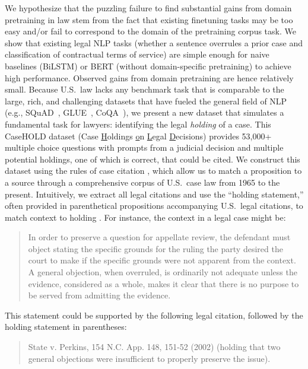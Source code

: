 \documentclass[sigconf]{acmart}
\begin{document}
We hypothesize that the puzzling failure to find substantial gains from domain pretraining in law stem from the fact that existing finetuning tasks may be too easy and/or fail to correspond to the domain of the pretraining corpus task. We show that  existing legal NLP tasks (whether a sentence overrules a prior case and classification of contractual terms of service) are simple enough for naive baselines (BiLSTM) or BERT (without domain-specific pretraining) to achieve high performance.  Observed gains from domain pretraining are hence relatively small. Because U.S.\ law lacks any benchmark task that is comparable to the large, rich, and challenging datasets that have fueled the general field of NLP (e.g., SQuAD~\cite{Rajpurkar2016}, GLUE~\cite{Wang2018}, CoQA~\cite{reddy2019coqa}), we present a new dataset that simulates a fundamental task for lawyers: identifying the legal \emph{holding} of a case.  This CaseHOLD dataset (Case \underline{H}oldings \underline{o}n \underline{L}egal \underline{D}ecisions) provides 53,000+ multiple choice questions with prompts from a judicial decision and multiple potential holdings, one of which is correct, that could be cited.  We construct this dataset using the rules of case citation \cite{bluebook}, which allow us to match a proposition to a source through a comprehensive corpus of U.S.\ case law from 1965 to the present. Intuitively, we extract all legal citations and use the ``holding statement,'' often provided in parenthetical propositions accompanying U.S.\ legal citations, to match context to holding \cite{arredondo2017harvesting}.  For instance, the context in a legal case might be: 
\begin{quote}
In order to preserve a question for appellate review, the defendant must object stating the specific grounds for the ruling the party desired the court to make if the specific grounds were not apparent from the context. 
A general objection, when overruled, is ordinarily not adequate unless the evidence, considered as a whole, makes it clear that there is no purpose to be served from admitting the evidence.
\end{quote} 
This statement could be supported by the following legal citation, followed by the holding statement in parentheses:
\begin{quote}
State v. Perkins, 154 N.C. App. 148, 151-52 (2002) (holding that two general objections were insufficient to properly preserve the issue). 
\end{quote}
\end{document}
